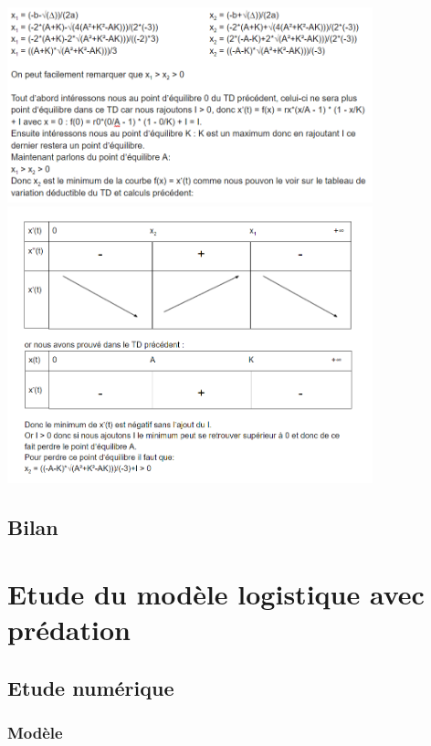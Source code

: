 \documentclass{article}
\begin{document}
\begin{center}
\includegraphics[width=400px]{1.png}
\includegraphics[width=400px]{2.png}
\end{center}

\subsection{Bilan}
\paragraph{}

\newpage
\section{Etude du modèle logistique avec prédation}

\subsection{Etude numérique}

\subsubsection{Modèle}
\end{document}
